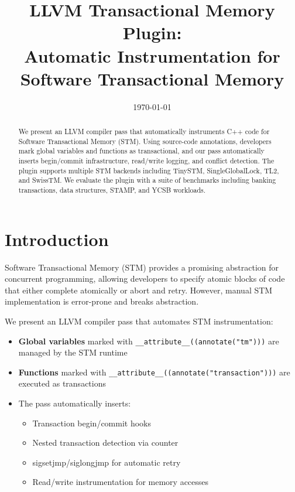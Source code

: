 \documentclass[article,12pt]{article}
\title{LLVM Transactional Memory Plugin:\\Automatic Instrumentation for Software Transactional Memory}
\author{}
\date{\today}
\begin{document}
\maketitle

\begin{abstract}
We present an LLVM compiler pass that automatically instruments C++ code for Software Transactional Memory (STM). Using source-code annotations, developers mark global variables and functions as transactional, and our pass automatically inserts begin/commit infrastructure, read/write logging, and conflict detection. The plugin supports multiple STM backends including TinySTM, SingleGlobalLock, TL2, and SwissTM. We evaluate the plugin with a suite of benchmarks including banking transactions, data structures, STAMP, and YCSB workloads.
\end{abstract}

\section{Introduction}

Software Transactional Memory (STM) provides a promising abstraction for concurrent programming, allowing developers to specify atomic blocks of code that either complete atomically or abort and retry. However, manual STM implementation is error-prone and breaks abstraction.

We present an LLVM compiler pass that automates STM instrumentation:

\begin{itemize}
\item \textbf{Global variables} marked with \texttt{\_\_attribute\_\_((annotate("tm")))} are managed by the STM runtime
\item \textbf{Functions} marked with \texttt{\_\_attribute\_\_((annotate("transaction")))} are executed as transactions
\item The pass automatically inserts:
  \begin{itemize}
  \item Transaction begin/commit hooks
  \item Nested transaction detection via counter
  \item sigsetjmp/siglongjmp for automatic retry
  \item Read/write instrumentation for memory accesses
  \end{itemize}
\end{itemize}

\end{document}
